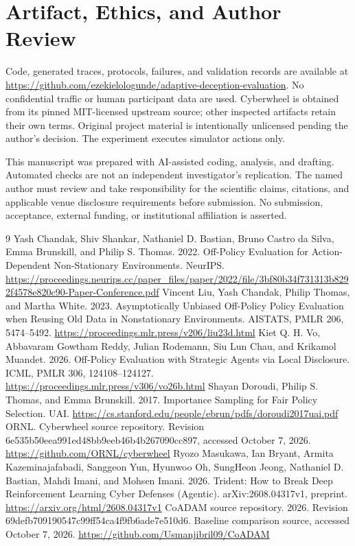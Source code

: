 \documentclass[sigconf,nonacm]{acmart}
\begin{document}
\section*{Artifact, Ethics, and Author Review}
Code, generated traces, protocols, failures, and validation records are available at \url{https://github.com/ezekielologunde/adaptive-deception-evaluation}. No confidential traffic or human participant data are used. Cyberwheel is obtained from its pinned MIT-licensed upstream source; other inspected artifacts retain their own terms. Original project material is intentionally unlicensed pending the author's decision. The experiment executes simulator actions only.

This manuscript was prepared with AI-assisted coding, analysis, and drafting. Automated checks are not an independent investigator's replication. The named author must review and take responsibility for the scientific claims, citations, and applicable venue disclosure requirements before submission. No submission, acceptance, external funding, or institutional affiliation is asserted.

\begin{thebibliography}{9}
 Yash Chandak, Shiv Shankar, Nathaniel D. Bastian, Bruno Castro da Silva, Emma Brunskill, and Philip S. Thomas. 2022. Off-Policy Evaluation for Action-Dependent Non-Stationary Environments. NeurIPS. \url{https://proceedings.neurips.cc/paper_files/paper/2022/file/3bf80b34f731313b8292f4578e820c90-Paper-Conference.pdf}
 Vincent Liu, Yash Chandak, Philip Thomas, and Martha White. 2023. Asymptotically Unbiased Off-Policy Policy Evaluation when Reusing Old Data in Nonstationary Environments. AISTATS, PMLR 206, 5474--5492. \url{https://proceedings.mlr.press/v206/liu23d.html}
 Kiet Q. H. Vo, Abbavaram Gowtham Reddy, Julian Rodemann, Siu Lun Chau, and Krikamol Muandet. 2026. Off-Policy Evaluation with Strategic Agents via Local Disclosure. ICML, PMLR 306, 124108--124127. \url{https://proceedings.mlr.press/v306/vo26b.html}
 Shayan Doroudi, Philip S. Thomas, and Emma Brunskill. 2017. Importance Sampling for Fair Policy Selection. UAI. \url{https://cs.stanford.edu/people/ebrun/pdfs/doroudi2017uai.pdf}
 ORNL. Cyberwheel source repository. Revision 6e535b50eea991ed48bb9eeb46b4b267090cc897, accessed October 7, 2026. \url{https://github.com/ORNL/cyberwheel}
 Ryozo Masukawa, Ian Bryant, Armita Kazeminajafabadi, Sanggeon Yun, Hyunwoo Oh, SungHeon Jeong, Nathaniel D. Bastian, Mahdi Imani, and Mohsen Imani. 2026. Trident: How to Break Deep Reinforcement Learning Cyber Defenses (Agentic). arXiv:2608.04317v1, preprint. \url{https://arxiv.org/html/2608.04317v1}
 CoADAM source repository. 2026. Revision 69defb709190547c99ff54ca4f9fb6ade7e510d6. Baseline comparison source, accessed October 7, 2026. \url{https://github.com/Usmanjibril09/CoADAM}
\end{thebibliography}
\end{document}
